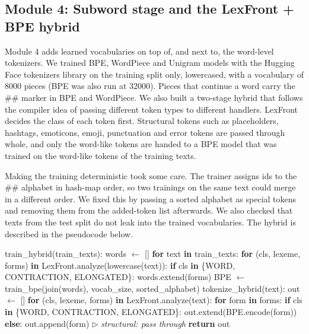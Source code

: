 \documentclass[journal,onecolumn,12pt,a4paper]{IEEEtran}
\begin{document}
\subsection{Module 4: Subword stage and the LexFront + BPE hybrid}\label{sec:3.6}
Module 4 adds learned vocabularies on top of, and next to, the word-level tokenizers. We trained BPE, WordPiece and Unigram models with the Hugging Face tokenizers library on the training split only, lowercased, with a vocabulary of 8000 pieces (BPE was also run at 32000). Pieces that continue a word carry the \#\# marker in BPE and WordPiece. We also built a two-stage hybrid that follows the compiler idea of passing different token types to different handlers. LexFront decides the class of each token first. Structural tokens such as placeholders, hashtags, emoticons, emoji, punctuation and error tokens are passed through whole, and only the word-like tokens are handed to a BPE model that was trained on the word-like tokens of the training texts.

Making the training deterministic took some care. The trainer assigns ids to the \#\# alphabet in hash-map order, so two trainings on the same text could merge in a different order. We fixed this by passing a sorted alphabet as special tokens and removing them from the added-token list afterwards. We also checked that texts from the test split do not leak into the trained vocabularies. The hybrid is described in the pseudocode below.

\begin{algorithm}[!t]
\footnotesize
\caption{LexFront + BPE hybrid tokenizer}\label{alg:5}
\begin{algorithmic}[1]
\State train\_hybrid(train\_texts):
\State \hspace*{1.0em}words $\leftarrow$ []
\State \hspace*{1.0em}\textbf{for} text \textbf{in} train\_texts:
\State \hspace*{2.0em}\textbf{for} (cls, lexeme, forms) \textbf{in} LexFront.analyze(lowercase(text)):
\State \hspace*{3.0em}\textbf{if} cls \textbf{in} \{WORD, CONTRACTION, ELONGATED\}: words.extend(forms)
\State \hspace*{1.0em}BPE $\leftarrow$ train\_bpe(join(words), vocab\_size, sorted\_alphabet)
\State tokenize\_hybrid(text):
\State \hspace*{1.0em}out $\leftarrow$ []
\State \hspace*{1.0em}\textbf{for} (cls, lexeme, forms) \textbf{in} LexFront.analyze(text):
\State \hspace*{2.0em}\textbf{for} form \textbf{in} forms:
\State \hspace*{3.0em}\textbf{if} cls \textbf{in} \{WORD, CONTRACTION, ELONGATED\}:
\State \hspace*{4.0em}out.extend(BPE.encode(form))
\State \hspace*{3.0em}\textbf{else}:
\State \hspace*{4.0em}out.append(form) \hfill{\scriptsize$\triangleright$ \textit{structural: pass through}}
\State \hspace*{1.0em}\textbf{return} out
\end{algorithmic}
\end{algorithm}
\end{document}
